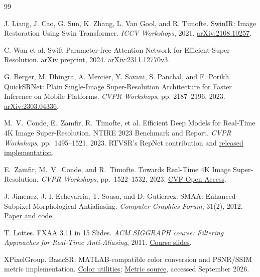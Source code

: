 \documentclass[10pt,twocolumn,letterpaper]{article}
\begin{document}
\begin{samepage}
\begin{thebibliography}{99}
\footnotesize\raggedright
\setlength{\itemsep}{1pt}
J. Liang, J. Cao, G. Sun, K. Zhang, L. Van Gool, and R. Timofte.
SwinIR: Image Restoration Using Swin Transformer.
\emph{ICCV Workshops}, 2021.
\href{https://arxiv.org/abs/2108.10257}{arXiv:2108.10257}.

C. Wan et al.
Swift Parameter-free Attention Network for Efficient Super-Resolution.
arXiv preprint, 2024.
\href{https://arxiv.org/abs/2311.12770v3}{arXiv:2311.12770v3}.

G. Berger, M. Dhingra, A. Mercier, Y. Savani, S. Panchal, and F. Porikli.
QuickSRNet: Plain Single-Image Super-Resolution Architecture for Faster Inference on Mobile Platforms.
\emph{CVPR Workshops}, pp. 2187--2196, 2023.
\href{https://arxiv.org/abs/2303.04336}{arXiv:2303.04336}.

M.~V.~Conde, E.~Zamfir, R.~Timofte, et al.
Efficient Deep Models for Real-Time 4K Image Super-Resolution. NTIRE 2023 Benchmark and Report.
\emph{CVPR Workshops}, pp.~1495--1521, 2023.
RTVSR's RepNet contribution and \href{https://github.com/ezrealzhang/REPNet_NTIRE23-RTSR}{released implementation}.

E.~Zamfir, M.~V.~Conde, and R.~Timofte.
Towards Real-Time 4K Image Super-Resolution.
\emph{CVPR Workshops}, pp.~1522--1532, 2023.
\href{https://openaccess.thecvf.com/content/CVPR2023W/NTIRE/html/Zamfir_Towards_Real-Time_4K_Image_Super-Resolution_CVPRW_2023_paper.html}{CVF Open Access}.

J. Jimenez, J. I. Echevarria, T. Sousa, and D. Gutierrez.
SMAA: Enhanced Subpixel Morphological Antialiasing.
\emph{Computer Graphics Forum}, 31(2), 2012.
\href{https://www.iryoku.com/smaa/}{Paper and code}.

T. Lottes.
FXAA 3.11 in 15 Slides.
\emph{ACM SIGGRAPH course: Filtering Approaches for Real-Time Anti-Aliasing}, 2011.
\href{https://www.iryoku.com/aacourse/downloads/09-FXAA-3.11-in-15-Slides.pdf}{Course slides}.

XPixelGroup.
BasicSR: MATLAB-compatible color conversion and PSNR/SSIM metric implementation.
\href{https://github.com/XPixelGroup/BasicSR/blob/master/basicsr/utils/color_util.py}{Color utilities};
\href{https://github.com/XPixelGroup/BasicSR/blob/master/basicsr/metrics/psnr_ssim.py}{Metric source}, accessed September 2026.


\end{thebibliography}
\end{samepage}
\end{document}
